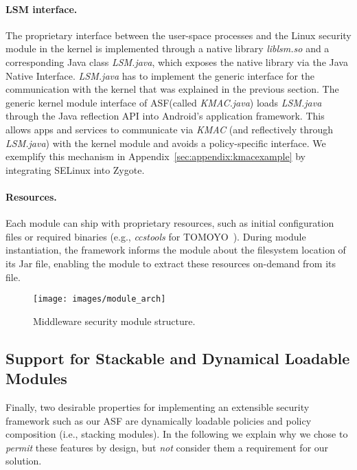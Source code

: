 \documentclass[letterpaper,twocolumn,10pt]{article}
\newcommand{\OURSHORT}{\textsc{ASF}\xspace}
\begin{document}
\paragraph{LSM interface.} The proprietary interface between the user-space processes and the Linux security module in the kernel is implemented through a native library \textit{liblsm.so} and a corresponding Java class \textit{LSM.java}, which exposes the native library via the Java Native Interface. \textit{LSM.java} has to implement the generic interface for the communication with the kernel that was explained in the previous section. The generic kernel module interface of \OURSHORT (called \textit{KMAC.java}) loads \textit{LSM.java} through the Java reflection API into Android's application framework. This allows apps and services to communicate via \textit{KMAC} (and reflectively through \textit{LSM.java}) with the kernel module and avoids a policy-specific interface. We exemplify this mechanism in Appendix~\ref{sec:appendix:kmacexample} by integrating SELinux into Zygote.

\paragraph{Resources.} Each module can ship with proprietary resources, such as initial configuration files or required binaries (e.g., \textit{ccstools} for TOMOYO~\cite{tomoyo}). During module instantiation, the framework informs the module about the filesystem location of its Jar file, enabling the module to extract these resources on-demand from its file.


\begin{figure}[t]
  \centering
  \texttt{[image: images/module\_arch]}
  \caption{Middleware security module structure.}
  \label{fig:arch:modulearch}
\end{figure}

\subsection{Support for Stackable and Dynamical Loadable Modules}
\label{sec:eval:loadable}

Finally, two desirable properties for implementing an extensible security framework such as our \OURSHORT are dynamically loadable policies and policy composition (i.e., stacking modules). In the following we explain why we chose to \textit{permit} these features by design, but \textit{not} consider them a requirement for our solution.
\end{document}
